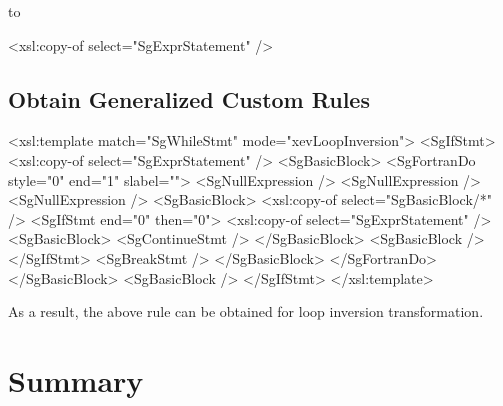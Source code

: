to

\begin{framed}
\begin{src}
		<xsl:copy-of select="SgExprStatement" />
\end{src}
\end{framed}


\subsection{Obtain Generalized Custom Rules}



\begin{framed}
\begin{src}
<xsl:template match="SgWhileStmt" mode="xevLoopInversion">
	<SgIfStmt>
		<xsl:copy-of select="SgExprStatement" />
		<SgBasicBlock>
			<SgFortranDo style="0" end="1" slabel="">
				<SgNullExpression />
				<SgNullExpression />
				<SgNullExpression />
				<SgBasicBlock>
					<xsl:copy-of select="SgBasicBlock/*" />
					<SgIfStmt end="0" then="0">
						<xsl:copy-of select="SgExprStatement" />
						<SgBasicBlock>
							<SgContinueStmt />
						</SgBasicBlock>
						<SgBasicBlock />
					</SgIfStmt>
					<SgBreakStmt />
				</SgBasicBlock>
			</SgFortranDo>
		</SgBasicBlock>
		<SgBasicBlock />
	</SgIfStmt>
</xsl:template>
\end{src}
\end{framed}


As a result, the above rule can be obtained for loop inversion transformation.

\section{Summary}



